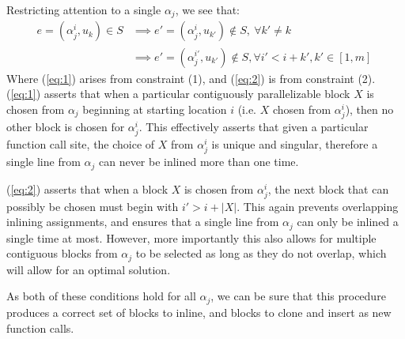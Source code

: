 \documentclass[12pt,twoside]{article}
\begin{document}
Restricting attention to a single $\alpha_j$, we see that:
	\begin{align}
		e = (\alpha_j^i, u_k) \in S& \implies e' = (\alpha_j^i, u_{k'}) \notin S,\ \forall k' \neq k \label{eq:1}\\ 
		& \implies e' = (\alpha_j^{i'}, u_{k'}) \notin S, \forall i' < i + k',k'\in [1,m]\  \label{eq:2}
	\end{align}
	Where (\ref{eq:1}) arises from constraint (1), and (\ref{eq:2}) is from constraint (2). (\ref{eq:1}) asserts that when a particular contiguously parallelizable block $X$ is chosen from $\alpha_j$ beginning at starting location $i$ (i.e. $X$ chosen from $\alpha_j^i$), then no other block is chosen for $\alpha_j^i$. This effectively asserts that given a particular function call site, the choice of $X$ from $\alpha_j^i$ is unique and singular, therefore a single line from $\alpha_j$ can never be inlined more than one time.   
	
	(\ref{eq:2}) asserts that when a block $X$ is chosen from $\alpha_j^i$, the next block that can possibly be chosen must begin with $i' > i + |X|$. This again prevents overlapping inlining assignments, and ensures that a single line from $\alpha_j$ can only be inlined a single time at most. However, more importantly this also allows for multiple contiguous blocks from $\alpha_j$ to be selected as long as they do not overlap, which will allow for an optimal solution. 

	As both of these conditions hold for all $\alpha_j$, we can be sure that this procedure produces a correct set of blocks to inline, and blocks to clone and insert as new function calls. 
\end{document}
